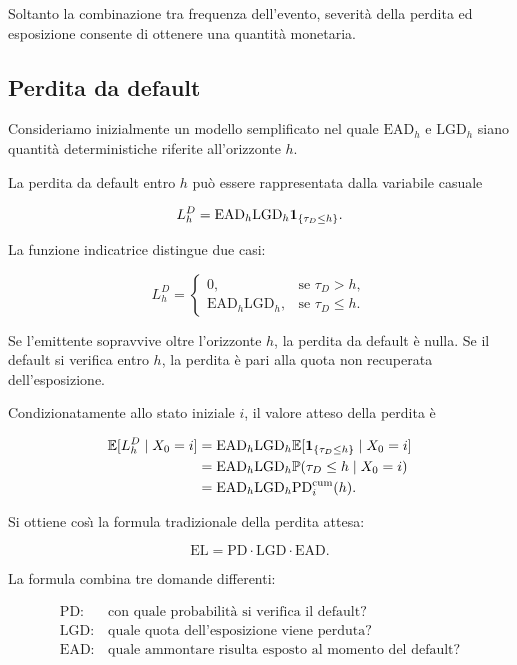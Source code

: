 Soltanto la combinazione tra frequenza dell'evento, severit\`{a} della
perdita ed esposizione consente di ottenere una quantit\`{a}
monetaria.

\subsection{Perdita da default}

\label{subsec:cap9-perdita-default}

Consideriamo inizialmente un modello semplificato nel quale
$\mathrm{EAD}_h$ e $\mathrm{LGD}_h$ siano quantit\`{a}
deterministiche riferite all'orizzonte $h$.

La perdita da default entro $h$ pu\`{o} essere rappresentata dalla
variabile casuale

\[
L_h^{D}
=
\mathrm{EAD}_h
\mathrm{LGD}_h
\mathbf{1}_{\{\tau_D\leq h\}}.
\]

La funzione indicatrice distingue due casi:

\[
L_h^{D}
=
\begin{cases}
0,
&
\text{se }\tau_D>h,
\\[1mm]
\mathrm{EAD}_h\mathrm{LGD}_h,
&
\text{se }\tau_D\leq h.
\end{cases}
\]

Se l'emittente sopravvive oltre l'orizzonte $h$, la perdita da
default \`{e} nulla. Se il default si verifica entro $h$, la perdita
\`{e} pari alla quota non recuperata dell'esposizione.

Condizionatamente allo stato iniziale $i$, il valore atteso della
perdita \`{e}

\[
\begin{split}
\mathbb{E}[L_h^{D}\mid X_0=i]
&=
\mathrm{EAD}_h
\mathrm{LGD}_h
\mathbb{E}[
\mathbf{1}_{\{\tau_D\leq h\}}
\mid X_0=i
]
\\
&=
\mathrm{EAD}_h
\mathrm{LGD}_h
\mathbb{P}(\tau_D\leq h\mid X_0=i)
\\
&=
\mathrm{EAD}_h
\mathrm{LGD}_h
\mathrm{PD}_{i}^{\mathrm{cum}}(h).
\end{split}
\]

Si ottiene cos\`{\i} la formula tradizionale della perdita attesa:

\[
\mathrm{EL}
=
\mathrm{PD}
\cdot
\mathrm{LGD}
\cdot
\mathrm{EAD}.
\]

La formula combina tre domande differenti:

\[
\begin{array}{ll}
\mathrm{PD}:&
\text{con quale probabilit\`{a} si verifica il default?}
\\[1mm]
\mathrm{LGD}:&
\text{quale quota dell'esposizione viene perduta?}
\\[1mm]
\mathrm{EAD}:&
\text{quale ammontare risulta esposto al momento del default?}
\end{array}
\]

